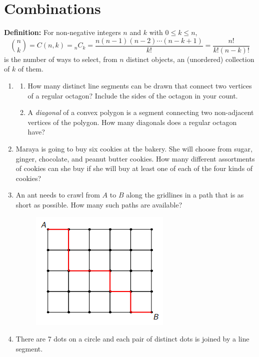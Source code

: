 \documentclass{article}
\begin{document}
\section*{Combinations}

\textbf{Definition:} For non-negative integers $n$ and $k$ with $0\leq k\leq n$,
\begin{equation*}
\binom{n}{k} = C(n,k) = {}_nC_k = \frac{n(n - 1)(n - 2)\cdots (n - k + 1)}{k!} = \frac{n!}{k!(n - k)!}
\end{equation*}
is the number of ways to select, from $n$ distinct objects, an (unordered) collection of $k$ of them.
\begin{enumerate}
\item \begin{enumerate}
\item How many distinct line segments can be drawn that connect two vertices of a regular octagon? Include the sides of the octagon in your count.\vspace{1cm}
\item A \emph{diagonal} of a convex polygon is a segment connecting two non-adjacent vertices of the polygon. How many diagonals does a regular octagon have?
\end{enumerate}\vspace{1cm}
\item Maraya is going to buy six cookies at the bakery. She will choose from sugar, ginger, chocolate, and peanut butter cookies. How many different assortments of cookies can she buy if she will buy at least one of each of the four kinds of cookies?\vspace{1cm}
\item An ant needs to crawl from $A$ to $B$ along the gridlines in a path that is as short as possible. How many such paths are available?
\begin{figure}[H]
\centering
\includegraphics[scale=0.5]{grid.png}
\end{figure}
\item There are 7 dots on a circle and each pair of distinct dots is joined by a line segment.

\end{enumerate}
\end{document}
